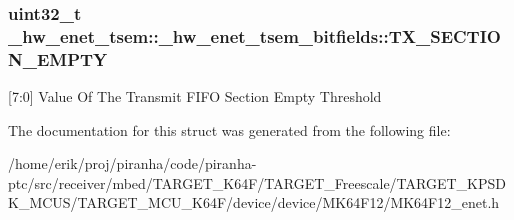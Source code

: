 \subsubsection[{\texorpdfstring{T\+X\+\_\+\+S\+E\+C\+T\+I\+O\+N\+\_\+\+E\+M\+P\+TY}{TX_SECTION_EMPTY}}]{\setlength{\rightskip}{0pt plus 5cm}uint32\+\_\+t \+\_\+hw\+\_\+enet\+\_\+tsem\+::\+\_\+hw\+\_\+enet\+\_\+tsem\+\_\+bitfields\+::\+T\+X\+\_\+\+S\+E\+C\+T\+I\+O\+N\+\_\+\+E\+M\+P\+TY}\hypertarget{struct__hw__enet__tsem_1_1__hw__enet__tsem__bitfields_adb203a6b2440eb23997160f9b011643e}{}\label{struct__hw__enet__tsem_1_1__hw__enet__tsem__bitfields_adb203a6b2440eb23997160f9b011643e}
\mbox{[}7\+:0\mbox{]} Value Of The Transmit F\+I\+FO Section Empty Threshold 

The documentation for this struct was generated from the following file\+:\begin{DoxyCompactItemize}
\item 
/home/erik/proj/piranha/code/piranha-\/ptc/src/receiver/mbed/\+T\+A\+R\+G\+E\+T\+\_\+\+K64\+F/\+T\+A\+R\+G\+E\+T\+\_\+\+Freescale/\+T\+A\+R\+G\+E\+T\+\_\+\+K\+P\+S\+D\+K\+\_\+\+M\+C\+U\+S/\+T\+A\+R\+G\+E\+T\+\_\+\+M\+C\+U\+\_\+\+K64\+F/device/device/\+M\+K64\+F12/M\+K64\+F12\+\_\+enet.\+h\end{DoxyCompactItemize}
